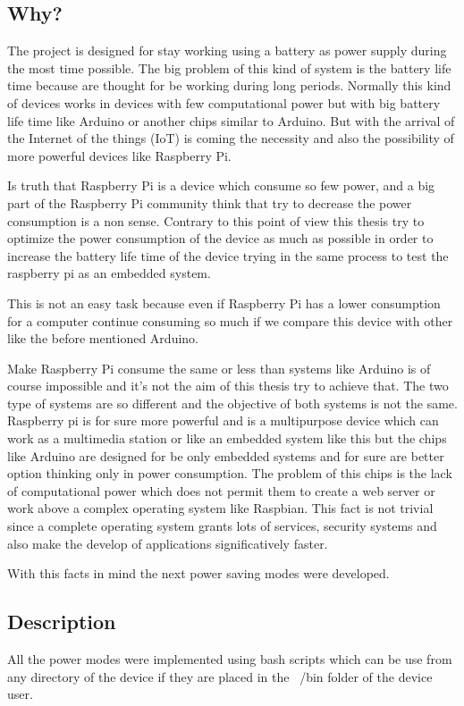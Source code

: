 		\subsection{Why?}
		The project is designed for stay working using a battery as power supply during the most time possible. The big problem of this kind of system is the battery life time because are thought for be working during long periods. Normally this kind of devices works in devices with few computational power but with big battery life time like Arduino or another chips similar to Arduino. But with the arrival of the Internet of the things (IoT) is coming the necessity and also the possibility of more powerful devices like Raspberry Pi. 

		Is truth that Raspberry Pi is a device which consume so few power, and a big part of the Raspberry Pi community think that try to decrease the power consumption is a non sense. Contrary to this point of view this thesis try to optimize the power consumption of the device as much as possible in order to increase the battery life time of the device trying in the same process to test the raspberry pi as an embedded system.

		This is not an easy task because even if Raspberry Pi has a lower consumption for a computer continue consuming so much if we compare this device with other like the before mentioned Arduino.

		Make Raspberry Pi consume the same or less than systems like Arduino is of course impossible and it's not the aim of this thesis try to achieve that. The two type of systems are so different and the objective of both systems is not the same. Raspberry pi is for sure more powerful and is a multipurpose device which can work as a multimedia station or like an embedded system like this but the chips like Arduino are designed for be only embedded systems and for sure are better option thinking only in power consumption. The problem of this chips is the lack of computational power which does not permit them to create a web server or work above a complex operating system like Raspbian. This fact is not trivial since a complete operating system grants lots of services, security systems and also make the develop of applications significatively faster.

		With this facts in mind the next power saving modes were developed.
		\subsection{Description}
		All the power modes were implemented using bash scripts which can be use from any directory of the device if they are placed in the ~/bin folder of the device user.


